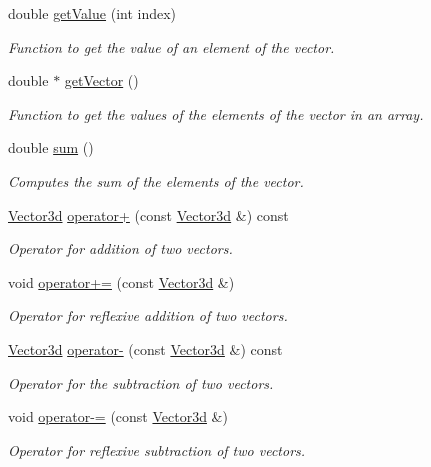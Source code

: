 \begin{DoxyCompactItemize}
double \hyperlink{classVector3d_a37055dde72eed6770cf3b2b11b56f0f8}{get\-Value} (int index)
\begin{DoxyCompactList}\small\item\em Function to get the value of an element of the vector. \end{DoxyCompactList}\item 
double $\ast$ \hyperlink{classVector3d_a12ca89ab46c79eb78fa6b75cad1a3616}{get\-Vector} ()
\begin{DoxyCompactList}\small\item\em Function to get the values of the elements of the vector in an array. \end{DoxyCompactList}\item 
double \hyperlink{classVector3d_a76fa7fc5a86ba77a6764eb0d9072e90a}{sum} ()
\begin{DoxyCompactList}\small\item\em Computes the sum of the elements of the vector. \end{DoxyCompactList}\item 
\hyperlink{classVector3d}{Vector3d} \hyperlink{classVector3d_ad714ad56910f370335c18262dc5cc13a}{operator+} (const \hyperlink{classVector3d}{Vector3d} \&) const 
\begin{DoxyCompactList}\small\item\em Operator for addition of two vectors. \end{DoxyCompactList}\item 
void \hyperlink{classVector3d_a034e9f847d613c9cba1cb47202b8143a}{operator+=} (const \hyperlink{classVector3d}{Vector3d} \&)
\begin{DoxyCompactList}\small\item\em Operator for reflexive addition of two vectors. \end{DoxyCompactList}\item 
\hyperlink{classVector3d}{Vector3d} \hyperlink{classVector3d_a727932bfb1f230c8f256e10a0d45a8c7}{operator-\/} (const \hyperlink{classVector3d}{Vector3d} \&) const 
\begin{DoxyCompactList}\small\item\em Operator for the subtraction of two vectors. \end{DoxyCompactList}\item 
void \hyperlink{classVector3d_a14d45e123683a1f1a2ba32d43083fcd7}{operator-\/=} (const \hyperlink{classVector3d}{Vector3d} \&)
\begin{DoxyCompactList}\small\item\em Operator for reflexive subtraction of two vectors. \end{DoxyCompactList}\item 

\end{DoxyCompactItemize}
